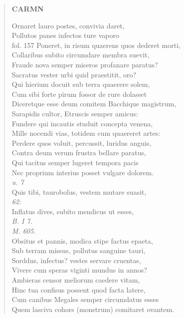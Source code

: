\documentclass[11pt, a4paper]{report}
\begin{document}
\begin{verse}
    \begin{center} \textbf{CARMN} \end{center} \marginpar{[00]} Ornaret lauro postes, convivia daret, \\ Pollutos panes infectos ture vaporo \\ fol. 157 Poneret, in risum quaerens quos dederet morti, \\ Collaribus subito circumdare membra suevit, \\ Fraude nova semper miseros profanare paratus? \\ Sacratus vester urbi quid praestitit, oro? \\ Qui hierium docuit sub terra quaerere solem, \\ Cum sibi forte pirum fossor de rure dolasset \\ Diceretque esse deum comitem Bacchique magistrum, \\ Sarapidis cultor, Etruscis semper amicus: \\ Fundere qui incautis studuit concepta venena, \\ Mille nocendi vias, totidem cum quaereret artes: \\ Perdere quos voluit, percussit, luridus anguis, \\ Contra deum verum frustra bellare paratus, \\ Qui tacitus semper lugeret tempora pacis \\ Nec proprium interius posset vulgare dolorem. \\ \textit{u. 7} \\ Quis tibi, taurobolus, vestem mutare suasit, \\ \textit{62:} \\ Inflatus dives, subito mendicus ut esses, \\ \textit{B. I 7.} \\ \textit{M. 605.} \\ Obsitus et pannis, modica stipe factus epaeta, \\ Sub terram missus, pollutus sanguine tauri, \\ Sorddns, infectus? vestes servare cruentas, \\ Vivere cum speras viginti mundus in annos? \\ Ambieras censor meliorum caedere vitam, \\ Hinc tua confisus possent quod facta latere, \\ Cum canibus Megales semper circumdatus esses \\ Quem lasciva cohors (monstrum) comitaret ovantem. \\ 

\end{verse}
\end{document}
